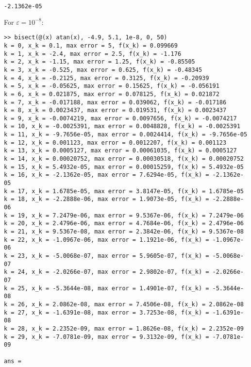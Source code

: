 \documentclass{homework}
\begin{document}
\begin{alphaparts}
\begin{enumerate}[label=\textbf{(\arabic*)}]
\begin{lstlisting}[basicstyle=\small\ttfamily, frame=single]
  -2.1362e-05
		\end{lstlisting}
		For $\varepsilon = 10^{-8}$:
		\begin{lstlisting}[basicstyle=\small\ttfamily, frame=single]
>> bisect(@(x) atan(x), -4.9, 5.1, 1e-8, 0, 50)
k = 0, x_k = 0.1, max error = 5, f(x_k) = 0.099669
k = 1, x_k = -2.4, max error = 2.5, f(x_k) = -1.176
k = 2, x_k = -1.15, max error = 1.25, f(x_k) = -0.85505
k = 3, x_k = -0.525, max error = 0.625, f(x_k) = -0.48345
k = 4, x_k = -0.2125, max error = 0.3125, f(x_k) = -0.20939
k = 5, x_k = -0.05625, max error = 0.15625, f(x_k) = -0.056191
k = 6, x_k = 0.021875, max error = 0.078125, f(x_k) = 0.021872
k = 7, x_k = -0.017188, max error = 0.039062, f(x_k) = -0.017186
k = 8, x_k = 0.0023437, max error = 0.019531, f(x_k) = 0.0023437
k = 9, x_k = -0.0074219, max error = 0.0097656, f(x_k) = -0.0074217
k = 10, x_k = -0.0025391, max error = 0.0048828, f(x_k) = -0.0025391
k = 11, x_k = -9.7656e-05, max error = 0.0024414, f(x_k) = -9.7656e-05
k = 12, x_k = 0.001123, max error = 0.0012207, f(x_k) = 0.001123
k = 13, x_k = 0.0005127, max error = 0.00061035, f(x_k) = 0.0005127
k = 14, x_k = 0.00020752, max error = 0.00030518, f(x_k) = 0.00020752
k = 15, x_k = 5.4932e-05, max error = 0.00015259, f(x_k) = 5.4932e-05
k = 16, x_k = -2.1362e-05, max error = 7.6294e-05, f(x_k) = -2.1362e-05
k = 17, x_k = 1.6785e-05, max error = 3.8147e-05, f(x_k) = 1.6785e-05
k = 18, x_k = -2.2888e-06, max error = 1.9073e-05, f(x_k) = -2.2888e-06
k = 19, x_k = 7.2479e-06, max error = 9.5367e-06, f(x_k) = 7.2479e-06
k = 20, x_k = 2.4796e-06, max error = 4.7684e-06, f(x_k) = 2.4796e-06
k = 21, x_k = 9.5367e-08, max error = 2.3842e-06, f(x_k) = 9.5367e-08
k = 22, x_k = -1.0967e-06, max error = 1.1921e-06, f(x_k) = -1.0967e-06
k = 23, x_k = -5.0068e-07, max error = 5.9605e-07, f(x_k) = -5.0068e-07
k = 24, x_k = -2.0266e-07, max error = 2.9802e-07, f(x_k) = -2.0266e-07
k = 25, x_k = -5.3644e-08, max error = 1.4901e-07, f(x_k) = -5.3644e-08
k = 26, x_k = 2.0862e-08, max error = 7.4506e-08, f(x_k) = 2.0862e-08
k = 27, x_k = -1.6391e-08, max error = 3.7253e-08, f(x_k) = -1.6391e-08
k = 28, x_k = 2.2352e-09, max error = 1.8626e-08, f(x_k) = 2.2352e-09
k = 29, x_k = -7.0781e-09, max error = 9.3132e-09, f(x_k) = -7.0781e-09

ans =


\end{lstlisting}
\end{enumerate}
\end{alphaparts}
\end{document}
